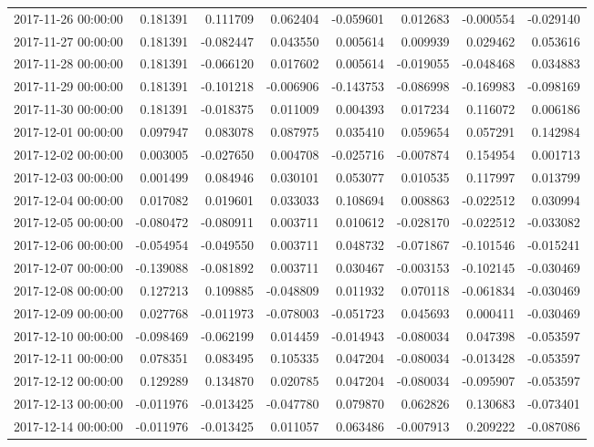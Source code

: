 \begin{tabular}{lrrrrrrr}
2017-11-26 00:00:00 & 0.181391 & 0.111709 & 0.062404 & -0.059601 & 0.012683 & -0.000554 & -0.029140 \\
2017-11-27 00:00:00 & 0.181391 & -0.082447 & 0.043550 & 0.005614 & 0.009939 & 0.029462 & 0.053616 \\
2017-11-28 00:00:00 & 0.181391 & -0.066120 & 0.017602 & 0.005614 & -0.019055 & -0.048468 & 0.034883 \\
2017-11-29 00:00:00 & 0.181391 & -0.101218 & -0.006906 & -0.143753 & -0.086998 & -0.169983 & -0.098169 \\
2017-11-30 00:00:00 & 0.181391 & -0.018375 & 0.011009 & 0.004393 & 0.017234 & 0.116072 & 0.006186 \\
2017-12-01 00:00:00 & 0.097947 & 0.083078 & 0.087975 & 0.035410 & 0.059654 & 0.057291 & 0.142984 \\
2017-12-02 00:00:00 & 0.003005 & -0.027650 & 0.004708 & -0.025716 & -0.007874 & 0.154954 & 0.001713 \\
2017-12-03 00:00:00 & 0.001499 & 0.084946 & 0.030101 & 0.053077 & 0.010535 & 0.117997 & 0.013799 \\
2017-12-04 00:00:00 & 0.017082 & 0.019601 & 0.033033 & 0.108694 & 0.008863 & -0.022512 & 0.030994 \\
2017-12-05 00:00:00 & -0.080472 & -0.080911 & 0.003711 & 0.010612 & -0.028170 & -0.022512 & -0.033082 \\
2017-12-06 00:00:00 & -0.054954 & -0.049550 & 0.003711 & 0.048732 & -0.071867 & -0.101546 & -0.015241 \\
2017-12-07 00:00:00 & -0.139088 & -0.081892 & 0.003711 & 0.030467 & -0.003153 & -0.102145 & -0.030469 \\
2017-12-08 00:00:00 & 0.127213 & 0.109885 & -0.048809 & 0.011932 & 0.070118 & -0.061834 & -0.030469 \\
2017-12-09 00:00:00 & 0.027768 & -0.011973 & -0.078003 & -0.051723 & 0.045693 & 0.000411 & -0.030469 \\
2017-12-10 00:00:00 & -0.098469 & -0.062199 & 0.014459 & -0.014943 & -0.080034 & 0.047398 & -0.053597 \\
2017-12-11 00:00:00 & 0.078351 & 0.083495 & 0.105335 & 0.047204 & -0.080034 & -0.013428 & -0.053597 \\
2017-12-12 00:00:00 & 0.129289 & 0.134870 & 0.020785 & 0.047204 & -0.080034 & -0.095907 & -0.053597 \\
2017-12-13 00:00:00 & -0.011976 & -0.013425 & -0.047780 & 0.079870 & 0.062826 & 0.130683 & -0.073401 \\
2017-12-14 00:00:00 & -0.011976 & -0.013425 & 0.011057 & 0.063486 & -0.007913 & 0.209222 & -0.087086 \\

\end{tabular}
